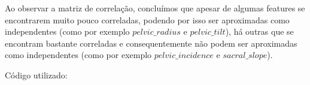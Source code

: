 \documentclass[a4paper,12pt]{article} %
\begin{document}
\begin{enumerate}
Ao observar a matriz de correlação, concluímos que apesar de algumas features se encontrarem muito pouco
correladas, podendo por isso ser aproximadas como independentes (como por exemplo $pelvic\_radius$ e $pelvic\_tilt$), há outras
que se encontram bastante correladas e consequentemente não podem ser aproximadas como independentes (como por exemplo $pelvic\_incidence$ e $sacral\_slope$).

Código utilizado:


\end{enumerate}
\end{document}
